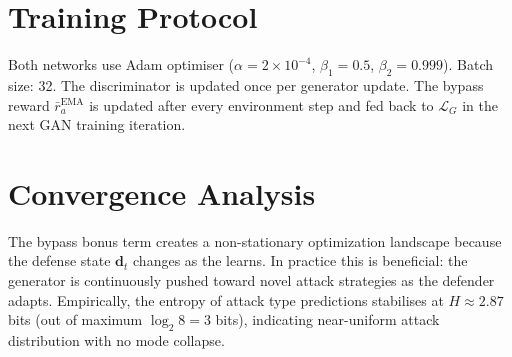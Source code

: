 \section{Training Protocol}

Both networks use Adam optimiser ($\alpha=2\times10^{-4}$,
$\beta_1=0.5$, $\beta_2=0.999$). Batch size: 32.
The discriminator is updated once per generator update.
The bypass reward $\bar r_a^{\mathrm{EMA}}$ is updated after every
environment step and fed back to $\mathcal{L}_G$ in the next GAN
training iteration.

\section{Convergence Analysis}

The bypass bonus term creates a non-stationary optimization landscape
because the defense state $\mathbf{d}_t$ changes as the \adpn{} learns.
In practice this is beneficial: the generator is continuously pushed
toward novel attack strategies as the defender adapts.
Empirically, the entropy of attack type predictions stabilises at
$H \approx 2.87$ bits (out of maximum $\log_2 8 = 3$ bits),
indicating near-uniform attack distribution with no mode collapse.
